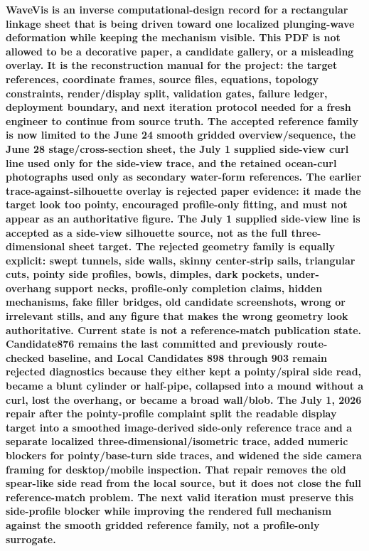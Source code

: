 \documentclass[12pt,letterpaper]{article}
\begin{document}
\vspace{0.35em}
\noindent\textbf{WaveVis is an inverse computational-design record for a rectangular linkage sheet that is being driven toward one localized plunging-wave deformation while keeping the mechanism visible. This PDF is not allowed to be a decorative paper, a candidate gallery, or a misleading overlay. It is the reconstruction manual for the project: the target references, coordinate frames, source files, equations, topology constraints, render/display split, validation gates, failure ledger, deployment boundary, and next iteration protocol needed for a fresh engineer to continue from source truth. The accepted reference family is now limited to the June 24 smooth gridded overview/sequence, the June 28 stage/cross-section sheet, the July 1 supplied side-view curl line used only for the side-view trace, and the retained ocean-curl photographs used only as secondary water-form references. The earlier trace-against-silhouette overlay is rejected paper evidence: it made the target look too pointy, encouraged profile-only fitting, and must not appear as an authoritative figure. The July 1 supplied side-view line is accepted as a side-view silhouette source, not as the full three-dimensional sheet target. The rejected geometry family is equally explicit: swept tunnels, side walls, skinny center-strip sails, triangular cuts, pointy side profiles, bowls, dimples, dark pockets, under-overhang support necks, profile-only completion claims, hidden mechanisms, fake filler bridges, old candidate screenshots, wrong or irrelevant stills, and any figure that makes the wrong geometry look authoritative. Current state is not a reference-match publication state. Candidate876 remains the last committed and previously route-checked baseline, and Local Candidates 898 through 903 remain rejected diagnostics because they either kept a pointy/spiral side read, became a blunt cylinder or half-pipe, collapsed into a mound without a curl, lost the overhang, or became a broad wall/blob. The July 1, 2026 repair after the pointy-profile complaint split the readable display target into a smoothed image-derived side-only reference trace and a separate localized three-dimensional/isometric trace, added numeric blockers for pointy/base-turn side traces, and widened the side camera framing for desktop/mobile inspection. That repair removes the old spear-like side read from the local source, but it does not close the full reference-match problem. The next valid iteration must preserve this side-profile blocker while improving the rendered full mechanism against the smooth gridded reference family, not a profile-only surrogate.}
\end{document}
